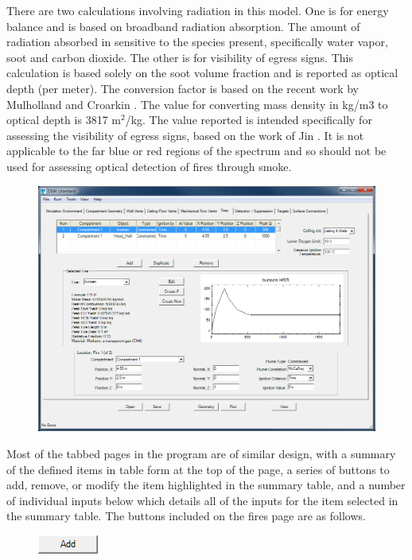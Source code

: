 There are two calculations involving radiation in this model. One is for energy balance and is based on broadband radiation absorption. The amount of radiation absorbed in sensitive to the species present, specifically water vapor, soot and carbon dioxide. The other is for visibility of egress signs. This calculation is based solely on the soot volume fraction and is reported as optical depth (per meter). The conversion factor is based on the recent work by Mulholland and Croarkin \cite{Mullholland:2000}. The value for converting mass density in kg/m3 to optical depth is 3817 m$^2$/kg. The value reported is intended specifically for assessing the visibility of egress signs, based on the work of Jin \cite{Jin:1979}.  It is not applicable to the far blue or red regions of the spectrum and so should not be used for assessing optical detection of fires through smoke.

\begin{figure}[h!]
\begin{center}
\includegraphics[width=6.5in]{FIGURES/Input_File/Fire_Tab}
\end{center}
\end{figure}
 
Most of the tabbed pages in the program are of similar design, with a summary of the defined items in table form at the top of the page, a series of buttons to add, remove, or modify the item highlighted in the summary table, and a number of individual inputs below which details all of the inputs for the item selected in the summary table. The buttons included on the fires page are as follows.


\begin{figure}
  \includegraphics[width=0.781in]{FIGURES/Input_File/Add_Button}
\end{figure}

